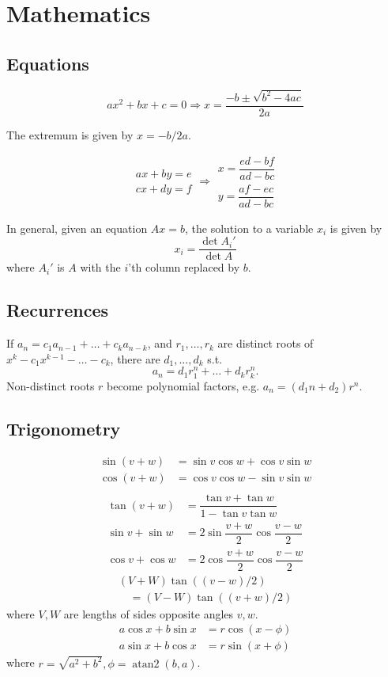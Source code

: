 
\chapter{Mathematics}

\section{Equations}
\[ax^2+bx+c=0 \Rightarrow x = \frac{-b\pm\sqrt{b^2-4ac}}{2a}\]

The extremum is given by $x = -b/2a$.

\[\begin{aligned}ax+by=e\\cx+dy=f\end{aligned}
\Rightarrow
\begin{aligned}x=\dfrac{ed-bf}{ad-bc}\\y=\dfrac{af-ec}{ad-bc}\end{aligned}\]

In general, given an equation $Ax = b$, the solution to a variable $x_i$ is given by
\[x_i = \frac{\det A_i'}{\det A} \]
where $A_i'$ is $A$ with the $i$'th column replaced by $b$.

\section{Recurrences}
If $a_n = c_1 a_{n-1} + \dots + c_k a_{n-k}$, and $r_1, \dots, r_k$ are distinct roots of $x^k - c_1 x^{k-1} - \dots - c_k$, there are $d_1, \dots, d_k$ s.t.
\[a_n = d_1r_1^n + \dots + d_kr_k^n. \]
Non-distinct roots $r$ become polynomial factors, e.g. $a_n = (d_1n + d_2)r^n$.

\section{Trigonometry}
\begin{align*}
\sin(v+w)&{}=\sin v\cos w+\cos v\sin w\\
\cos(v+w)&{}=\cos v\cos w-\sin v\sin w\\
\end{align*}
\begin{align*}
\tan(v+w)&{}=\dfrac{\tan v+\tan w}{1-\tan v\tan w}\\
\sin v+\sin w&{}=2\sin\dfrac{v+w}{2}\cos\dfrac{v-w}{2}\\
\cos v+\cos w&{}=2\cos\dfrac{v+w}{2}\cos\dfrac{v-w}{2}
\end{align*}
\[
\begin{aligned}
  (V+W)\tan((v-w)/2) \\
  \quad = (V-W)\tan((v+w)/2)
\end{aligned}
\]
where $V, W$ are lengths of sides opposite angles $v, w$.
\begin{align*}
	a\cos x+b\sin x&=r\cos(x-\phi)\\
	a\sin x+b\cos x&=r\sin(x+\phi)
\end{align*}
where $r=\sqrt{a^2+b^2}, \phi=\operatorname{atan2}(b,a)$.

